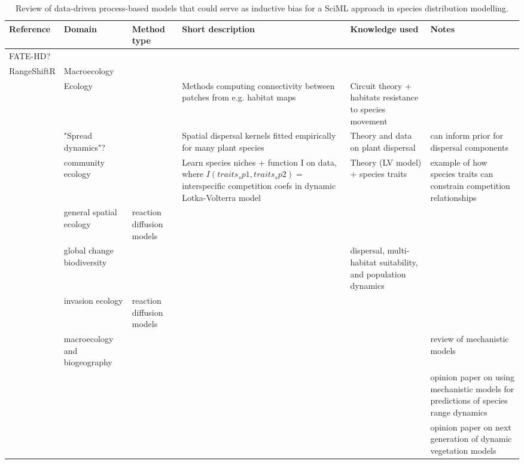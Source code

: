 \begin{table}[htbp]
\centering
\caption{Review of data-driven process-based models that could serve as inductive bias for a SciML approach in species distribution modelling.}
\small
\begin{tabular}{@{}p{2cm}>{\raggedright\arraybackslash}p{2.5cm}>{\raggedright\arraybackslash}p{2cm}>{\raggedright\arraybackslash}p{3cm}>{\raggedright\arraybackslash}p{2.5cm}>{\raggedright\arraybackslash}p{2cm}@{}}
\toprule
\textbf{Reference} & \textbf{Domain} & \textbf{Method type} & \textbf{Short description} & \textbf{Knowledge used} & \textbf{Notes} \\
\midrule
FATE-HD? &  & & & & \\
RangeShiftR & Macroecology & & & & \\
\cite{dickson2019circuit} & Ecology &  & Methods computing connectivity between patches from e.g. habitat maps & Circuit theory + habitats resistance to species movement &  \\
\cite{bullock2017synthesis} & "Spread dynamics"? &  & Spatial dispersal kernels fitted empirically for many plant species & Theory and data on plant dispersal &  can inform prior for dispersal components\\
\cite{chalmandrier2022predictions} & community ecology &  & Learn species niches + function I on data, where $I(traits_sp1,traits_sp2) =$ interspecific competition coefs in dynamic Lotka-Volterra model & Theory (LV model) + species traits &  example of how species traits can constrain competition relationships \\
\cite{cantrell2004} & general spatial ecology & reaction diffusion models \\
\cite{barber-omalley2022} & global change biodiversity & & & dispersal, multi-habitat suitability, and population dynamics \\
\cite{bonneau2016} & invasion ecology & reaction diffusion models & \\
\cite{cabral2017} & macroecology and biogeography & & & & review of mechanistic models \\
\cite{briscoe2019} & & & & & opinion paper on using mechanistic models for predictions of species range dynamics \\
\cite{Scheiter2013} & & & & & opinion paper on next generation of dynamic vegetation models \\
\bottomrule
\end{tabular}
\end{table}


